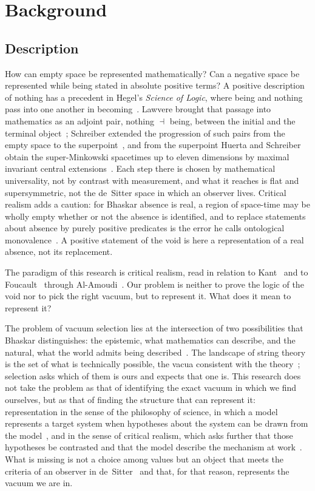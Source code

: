 \documentclass[11pt,reqno]{amsart}
\numberwithin{equation}{section}
\theoremstyle{remark}
\begin{document}
\section{Background}\label{sec:background}

\subsection{Description}
How can empty space be represented mathematically? Can a negative space be represented while being
stated in absolute positive terms? A positive description of nothing has a precedent in Hegel's
\emph{Science of Logic}, where being and nothing pass into one another in becoming~\cite[Book~I, Sect.~1, ch.~1]{Heg12}.
Lawvere brought that passage into mathematics as an adjoint pair, nothing $\dashv$ being, between the
initial and the terminal object~\cite{Law91,Law94,Law96}; Schreiber extended the progression of such pairs
from the empty space to the superpoint~\cite{Sch13}, and from the superpoint Huerta and Schreiber
obtain the super-Minkowski spacetimes up to eleven dimensions by maximal invariant central
extensions~\cite{HS18}. Each step there is chosen by mathematical universality, not by contrast with
measurement, and what it reaches is flat and supersymmetric, not the de~Sitter space in which an
observer lives. Critical realism adds a caution: for Bhaskar absence is real, a region of space-time
may be wholly empty whether or not the absence is identified, and to replace statements about absence
by purely positive predicates is the error he calls ontological monovalence~\cite[pp.~589--590,
595]{Bha93a}. A positive statement of the void is here a representation of a real absence, not its
replacement.

The paradigm of this research is critical realism, read in relation to Kant~\cite{KantKrV} and to
Foucault~\cite{Fou69} through Al-Amoudi~\cite{AA07}. Our problem is neither to prove the logic of the
void nor to pick the right vacuum, but to represent it. What does it mean to represent it?

The problem of vacuum selection lies at the intersection of two possibilities that Bhaskar
distinguishes: the epistemic, what mathematics can describe, and the natural, what the world admits
being described~\cite{Bha75}. The landscape of string theory is the set of what is technically
possible, the vacua consistent with the theory~\cite{BP00,Sus03}; selection asks which of them is ours and
expects that one is. This research does not take the problem as that of identifying the exact vacuum
in which we find ourselves, but as that of finding the structure that can represent it:
representation in the sense of the philosophy of science, in which a model represents a target
system when hypotheses about the system can be drawn from the model~\cite{Ngu26}, and in the sense of
critical realism, which asks further that those hypotheses be contrasted and that the model describe
the mechanism at work~\cite{Bha75}. What is missing is not a choice among values but an object that
meets the criteria of an observer in de~Sitter~\cite{Wit01,CLPW23,Wit24} and that, for that reason,
represents the vacuum we are in.
\end{document}
